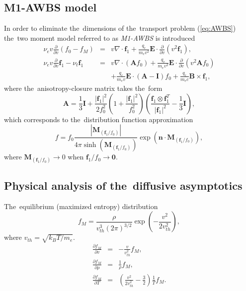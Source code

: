 \documentclass[review]{elsarticle}
\newcommand{\pdv}[2]{\frac{\partial{#1}}{\partial{#2}}}
\newcommand{\vect}[1]{\boldsymbol{#1}}
\newcommand{\matr}[1]{\mathbf{#1}}
\newcommand{\nue}{\nu_{e}}
\newcommand{\nutot}{\nu_{t}}
\newcommand{\vmag}{v}
\newcommand{\vth}{v_{th}}
\newcommand{\vn}{\vect{n}}
\newcommand{\E}{\vect{E}}
\newcommand{\B}{\vect{B}}
\newcommand{\qe}{q_e}
\newcommand{\me}{m_e}
\newcommand{\kB}{k_B}
\newcommand{\fM}{f_M}
\newcommand{\fzero}{f_0}
\newcommand{\fone}{\vect{f}_1}
\newcommand{\MI}{\matr{I}}
\newcommand{\MA}{\matr{A}}
\newcommand{\anisomega}{\fone/\fzero}
\newcommand{\acl}{\vect{M}_{\left(\anisomega\right)}}
\renewcommand{\refeq}[1]{(\ref{#1})}
\begin{document}
\subsection{M1-AWBS model}
In order to eliminate the~dimensions of the~transport problem \refeq{eq:AWBS}
the~two moment model referred to as \textit{M1-AWBS} is introduced
\begin{eqnarray}
  \nue\vmag\pdv{}{\vmag}\left(\fzero - \fM \right) &=&
  \vmag\nabla\cdot\fone + \frac{\qe}{\me\vmag^2}\E\cdot\pdv{}{\vmag}
  \left( \vmag^2 \fone\right) , 
  \label{eq:M1f0}\\
  \nue\vmag\pdv{}{\vmag}\fone - \nutot\fone &=& 
  \vmag\nabla\cdot\left(\MA\fzero\right) + 
  \frac{\qe}{\me\vmag^2}\E\cdot\pdv{}{\vmag}
  \left( \vmag^2 \MA\fzero\right) \nonumber\\
  && + \frac{\qe}{\me\vmag}\E\cdot\left( \MA - \MI \right)\fzero +
  \frac{\qe}{\me c}\B\times\fone ,
  \label{eq:M1f1}
\end{eqnarray}
where the~anisotropy-closure matrix takes the~form
\begin{equation}
  \MA = \frac{1}{3}\MI + \frac{|\fone|^2}{2\fzero^2}
  \left( 1 + \frac{|\fone|^2}{\fzero^2} \right)
  \left( \frac{\fone\otimes\fone^T}{|\fone|^2} - \frac{1}{3}\MI\right) ,
\end{equation}
which corresponds to the~distribution function approximation
\begin{equation}
  f = \fzero \frac{\left|\acl\right|}{4\pi\sinh\left(\acl\right)}
  \exp\left(\vn\cdot\acl\right) ,
\end{equation}
where $\acl \rightarrow 0$ when $\anisomega \rightarrow \vect{0}$. 

\subsection{Physical analysis of the~diffusive asymptotics}\label{sec:diffusive_asymptotics}
The~equilibrium (maximized entropy) distribution
\begin{equation}
  \fM = \frac{\rho}{\vth^3 \left( 2 \pi \right)^{3/2}} 
  \exp\left(- \frac{\vmag^2}{2 \vth^2} \right) ,
  \label{eq:MaxBol}
\end{equation}
where $\vth = \sqrt{\kB T/\me}$.
\begin{eqnarray}
  \pdv{\fM}{\vmag} &=& -\frac{\vmag}{\vth^2}\fM ,
  \nonumber \\
  \pdv{\fM}{\rho} &=& \frac{1}{\rho}\fM ,
  \nonumber \\
  \pdv{\fM}{T} &=& \left( \frac{\vmag^2}{2 \vth^2} - \frac{3}{2}\right)
  \frac{1}{T}\fM. 
\end{eqnarray}
\end{document}
